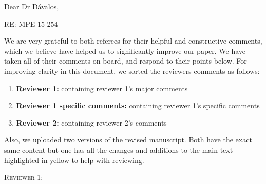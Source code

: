\documentclass[12pt,letterpaper]{article}
\renewcommand{\section}[1]{%
\bigskip
\begin{center}
\begin{Large}
\normalfont\scshape #1
\medskip
\end{Large}
\end{center}}
\begin{document}
Dear Dr D\'{a}valos,

RE: MPE-15-254

We are very grateful to both referees for their helpful and constructive comments, which we believe have helped us to significantly improve our paper. We have taken all of their comments on board, and respond to their points below. For improving clarity in this document, we sorted the reviewers comments as follows:
\begin{enumerate}
\item \textbf{Reviewer 1:} containing reviewer 1's major comments
\item \textbf{Reviewer 1 specific comments:} containing reviewer 1's specific comments
\item \textbf{Reviewer 2:} containing reviewer 2's comments
\end{enumerate}
Also, we uploaded two versions of the revised manuscript. Both have the exact same content but one has all the changes and additions to the main text highlighted in yellow to help with reviewing.



\section{Reviewer 1:}
\end{document}
